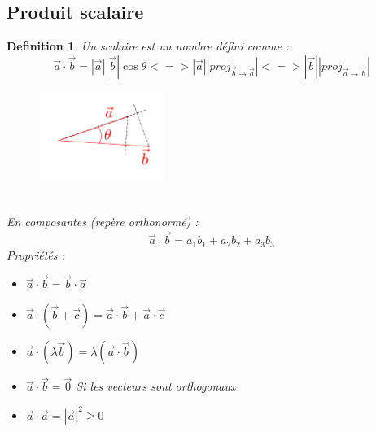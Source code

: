 \documentclass{article}
\newtheorem{definition}{Definition}[section]
\begin{document}
\subsection{Produit scalaire}
\begin{definition}
    Un scalaire est un nombre défini comme :
    \[ \overrightarrow{a}\cdot \overrightarrow{b} = |\overrightarrow{a}||\overrightarrow{b}| \cos{\theta} <=> |\overrightarrow{a}||proj_{\overrightarrow{b}\rightarrow \overrightarrow{a}}| <=> |\overrightarrow{b}||proj_{\overrightarrow{a}\rightarrow \overrightarrow{b}}|\]
    \begin{figure}[h]
        \centering
        \includegraphics[height=3cm]{Images/Produit scalaire.png}
        \label{fig:prodscal}
    \end{figure}
    \\En composantes (repère orthonormé) :
    \[ \overrightarrow{a} \cdot \overrightarrow{b} =  a_1b_1 + a_2b_2 + a_3b_3\]
    Propriétés :
    \begin{multicols}{2}
        \begin{itemize}
            \item \( \overrightarrow{a} \cdot \overrightarrow{b} = \overrightarrow{b} \cdot \overrightarrow{a} \)
            \item \( \overrightarrow{a} \cdot (\overrightarrow{b} + \overrightarrow{c}) = \overrightarrow{a} \cdot \overrightarrow{b} + \overrightarrow{a} \cdot \overrightarrow{c}\)
            \item \( \overrightarrow{a}  \cdot (\lambda\overrightarrow{b}) = \lambda(\overrightarrow{a} \cdot \overrightarrow{b}) \)
        \end{itemize}
        \columnbreak
        \begin{itemize}
            \item \( \overrightarrow{a} \cdot \overrightarrow{b} = \overrightarrow{0} \) Si les vecteurs sont orthogonaux
            \item \( \overrightarrow{a} \cdot \overrightarrow{a} = |\overrightarrow{a}|^2 \geq 0\)
        \end{itemize}
    \end{multicols}
\end{definition}
\end{document}
